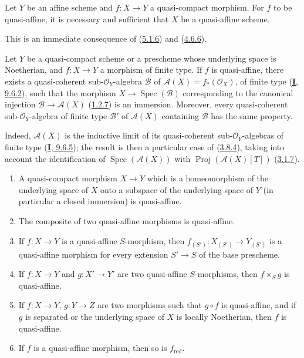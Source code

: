 \begin{corollary}[5.1.8]
\label{II.5.1.8}
Let $Y$ be an affine scheme and $f:X\to Y$ a quasi-compact morphism. For
$f$ to be quasi-affine, it is necessary and sufficient that $X$ be a
quasi-affine scheme.
\end{corollary}

This is an immediate consequence of (\hyperref[II.5.1.6]{5.1.6}) and
(\hyperref[II.4.6.6]{4.6.6}).

\begin{corollary}[5.1.9]
\label{II.5.1.9}
Let $Y$ be a quasi-compact scheme or a prescheme whose underlying space
is Noetherian, and $f:X\to Y$ a morphism \textup{of finite type}. If $f$ is
quasi-affine, there exists a quasi-coherent sub-$\mathcal{O}_Y$-algebra
$\mathcal{B}$ of $\mathcal{A}(X)=f_*(\mathcal{O}_X)$, \textup{of finite type
(\hyperref[I.9.6.2]{\textbf{I}, 9.6.2})}, such that the morphism
$X\to\operatorname{Spec}(\mathcal{B})$ corresponding to the canonical injection
$\mathcal{B}\to\mathcal{A}(X)$ \textup{(\hyperref[II.1.2.7]{1.2.7})} is an
immersion. Moreover, every quasi-coherent sub-$\mathcal{O}_Y$-algebra of
finite type $\mathcal{B}'$ of $\mathcal{A}(X)$ containing $\mathcal{B}$
has the same property.
\end{corollary}

Indeed, $\mathcal{A}(X)$ is the inductive limit of its quasi-coherent
sub-$\mathcal{O}_Y$-algebras of finite type
(\hyperref[I.9.6.5]{\textbf{I}, 9.6.5}); the result is then a particular case
of (\hyperref[II.3.8.4]{3.8.4}), taking into account the identification of
$\operatorname{Spec}(\mathcal{A}(X))$ with
$\operatorname{Proj}(\mathcal{A}(X)[T])$
(\hyperref[II.3.1.7]{3.1.7}).

\begin{proposition}[5.1.10]
\label{II.5.1.10}
\begin{enumerate}
  \item[\rm{(i)}] A quasi-compact morphism $X\to Y$ which is a
  homeomorphism of the underlying space of $X$ onto a subspace of the
  underlying space of $Y$ (in particular a closed immersion) is
  quasi-affine.
  \item[\rm{(ii)}] The composite of two quasi-affine morphisms is
  quasi-affine.
  \item[\rm{(iii)}] If $f:X\to Y$ is a quasi-affine $S$-morphism, then
  $f_{(S')}:X_{(S')}\to Y_{(S')}$ is a quasi-affine morphism for every
  extension $S'\to S$ of the base prescheme.
  \item[\rm{(iv)}] If $f:X\to Y$ and $g:X'\to Y'$ are two quasi-affine
  $S$-morphisms, then $f\times_S g$ is quasi-affine.
  \item[\rm{(v)}] If $f:X\to Y$, $g:Y\to Z$ are two morphisms such that
  $g\circ f$ is quasi-affine, and if $g$ is separated or the underlying
  space of $X$ is locally Noetherian, then $f$ is quasi-affine.
  \item[\rm{(vi)}] If $f$ is a quasi-affine morphism, then so is
  $f_{\mathrm{red}}$.
\end{enumerate}
\end{proposition}


